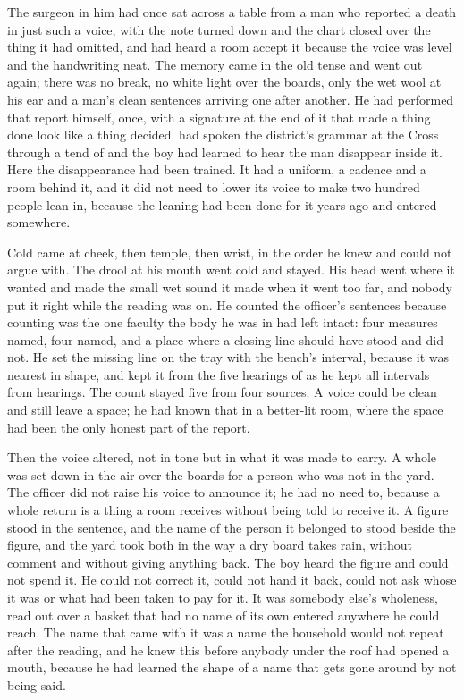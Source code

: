 The surgeon in him had once sat across a table from a man who reported a death in just such a voice, with the note turned down and the chart closed over the thing it had omitted, and had heard a room accept it because the voice was level and the handwriting neat. The memory came in the old tense and went out again; there was no break, no white light over the boards, only the wet wool at his ear and a man's clean sentences arriving one after another. He had performed that report himself, once, with a signature at the end of it that made a thing done look like a thing decided.  had spoken the district's grammar at the Cross through a tend of  and the boy had learned to hear the man disappear inside it. Here the disappearance had been trained. It had a uniform, a cadence and a room behind it, and it did not need to lower its voice to make two hundred people lean in, because the leaning had been done for it years ago and entered somewhere.

Cold came at cheek, then temple, then wrist, in the order he knew and could not argue with. The drool at his mouth went cold and stayed. His head went where it wanted and made the small wet sound it made when it went too far, and nobody put it right while the reading was on. He counted the officer's sentences because counting was the one faculty the body he was in had left intact: four measures named, four named, and a place where a closing line should have stood and did not. He set the missing line on the tray with the bench's interval, because it was nearest in shape, and kept it from the five hearings of  as he kept all intervals from hearings. The count stayed five from four sources. A voice could be clean and still leave a space; he had known that in a better-lit room, where the space had been the only honest part of the report.

Then the voice altered, not in tone but in what it was made to carry. A whole  was set down in the air over the boards for a person who was not in the yard. The officer did not raise his voice to announce it; he had no need to, because a whole return is a thing a room receives without being told to receive it. A figure stood in the sentence, and the name of the person it belonged to stood beside the figure, and the yard took both in the way a dry board takes rain, without comment and without giving anything back. The boy heard the figure and could not spend it. He could not correct it, could not hand it back, could not ask whose it was or what had been taken to pay for it. It was somebody else's wholeness, read out over a basket that had no name of its own entered anywhere he could reach. The name that came with it was a name the household would not repeat after the reading, and he knew this before anybody under the roof had opened a mouth, because he had learned the shape of a name that gets gone around by not being said.

